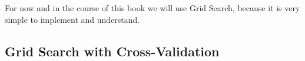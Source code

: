 For now and in the course of this book we will use Grid Search, because it is very simple to implement and understand.

\subsection{Grid Search with Cross-Validation}

\framedtext{\color{red}{TODO:}}

